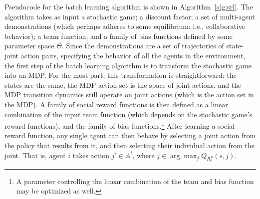 Pseudocode for the batch learning algorithm is shown in Algorithm~\ref{alg:srl}.
%
The algorithm takes as input a stochastic game; a discount factor; a
set of multi-agent demonstrations (which perhaps adheres to some
equilibrium: i.e., collaborative behavior); a team function; and a
family of bias functions defined by some parameter space $\Theta$.
%
Since the demonstrations are a set of trajectories of state-joint
action pairs, specifying the behavior of all the agents in the
environment, the first step of the batch learning algorithm is to
transform the stochastic game into an MDP. For the most part, this
transformation is straightforward: the states are the same, the MDP
action set is the space of joint actions, and the MDP transition
dynamics still operate on joint actions (which is the action set in
the MDP). A family of social reward functions is then defined as a
linear combination of the input team function (which depends on the
stochastic game's reward functions), and the family of bias
functions.\footnote{A parameter controlling the linear
combination of the team and bias function may be optimized as well.}
%
After learning a social reward function, any single agent can then
behave by selecting a joint action from the policy that results from
it, and then selecting their individual action from the joint. That
is, agent $i$ takes action $j^i \in A^i$, where 
$j \in \arg \max_j Q_{R^S_\theta}(s, j)$.


